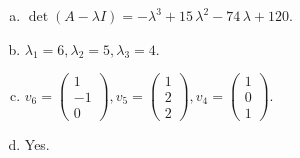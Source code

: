 \begin{questions}
\begin{solution}
\begin{enumerate}[(a)]
\item $\det(A-\lambda I)=-{\lambda}^{3} + 15 \, {\lambda}^{2} - 74 \, {\lambda} + 120$.
\item ${\lambda}_1=6, {\lambda}_2=5, {\lambda}_3=4$.
\item $v_{6}=\left(\begin{array}{r}
1 \\
-1 \\
0
\end{array}\right), v_{5}=\left(\begin{array}{r}
1 \\
2 \\
2
\end{array}\right), v_{4}=\left(\begin{array}{r}
1 \\
0 \\
1
\end{array}\right)$.
\item Yes.
\end{enumerate}
\end{solution}

\end{questions}

\newpage


\begin{center}
\end{center}

